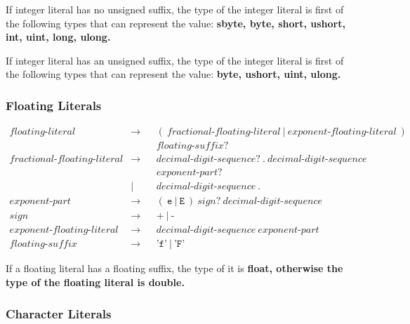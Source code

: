 \documentclass[a4paper,oneside,11pt]{article}
\begin{document}
If integer literal has no unsigned suffix, the type of the integer literal
is first of the following types that can represent the value:
\bf{sbyte}, \bf{byte}, \bf{short}, \bf{ushort}, \bf{int}, \bf{uint}, \bf{long}, \bf{ulong}.

If integer literal has an unsigned suffix, the type of the integer literal is
first of the following types that can represent the value:
\bf{byte}, \bf{ushort}, \bf{uint}, \bf{ulong}.

\subsubsection{Floating Literals}\label{floatingliteral}

\begin{align*}
floating\textrm{-}literal &\rightarrow & &( \> fractional\textrm{-}floating\textrm{-}literal \> | \> exponent\textrm{-}floating\textrm{-}literal \>)\\
& & &floating\textrm{-}suffix?\\
fractional\textrm{-}floating\textrm{-}literal &\rightarrow & &\hyperref[decimaldigitsequence]{decimal\textrm{-}digit\textrm{-}sequence}? \> \texttt{.}
\> \hyperref[decimaldigitsequence]{decimal\textrm{-}digit\textrm{-}sequence}\\
& & &exponent\textrm{-}part?\\
&| & &\hyperref[decimaldigitsequence]{decimal\textrm{-}digit\textrm{-}sequence} \> \texttt{.}\\
exponent\textrm{-}part &\rightarrow & &(\> \texttt{e} \> | \> \texttt{E} \>) \> sign? \> \hyperref[decimaldigitsequence]{decimal\textrm{-}digit\textrm{-}sequence}\\
sign &\rightarrow & &\texttt{+} \> | \> \texttt{-}\\
exponent\textrm{-}floating\textrm{-}literal &\rightarrow & &\hyperref[decimaldigitsequence]{decimal\textrm{-}digit\textrm{-}sequence} \> exponent\textrm{-}part\\
floating\textrm{-}suffix &\rightarrow & &\texttt{'f'} \> | \> \texttt{'F'}
\end{align*}

If a floating literal has a floating suffix, the type of it is \bf{float},
otherwise the type of the floating literal is \bf{double}.

\subsubsection{Character Literals}\label{characterliteral}\label{escape}
\end{document}
